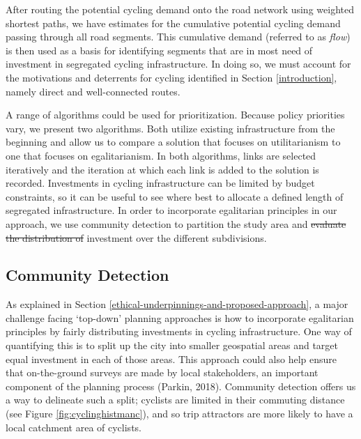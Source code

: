 \documentclass[
]{article}
\providecommand{\DIFaddtex}[1]{{\protect\color{blue}\uwave{#1}}} %
\providecommand{\DIFdeltex}[1]{{\protect\color{red}\sout{#1}}}                      %
\providecommand{\DIFaddbegin}{} %
\providecommand{\DIFaddend}{} %
\providecommand{\DIFdelbegin}{} %
\providecommand{\DIFdelend}{} %
\providecommand{\DIFadd}[1]{\texorpdfstring{\DIFaddtex{#1}}{#1}} %
\providecommand{\DIFdel}[1]{\texorpdfstring{\DIFdeltex{#1}}{}} %
\newcommand{\DIFscaledelfig}{0.5}
\newlength{\DIFdelgraphicswidth} %
\newlength{\DIFdelgraphicsheight} %
\newcommand{\DIFaddincludegraphics}[2][]{{\color{blue}\fbox{\DIFOincludegraphics[#1]{#2}}}} %
\newcommand{\DIFdelincludegraphics}[2][]{%
\sbox{\DIFdelgraphicsbox}{\DIFOincludegraphics[#1]{#2}}%
\settoboxwidth{\DIFdelgraphicswidth}{\DIFdelgraphicsbox} %
\settoboxtotalheight{\DIFdelgraphicsheight}{\DIFdelgraphicsbox} %
\scalebox{\DIFscaledelfig}{%
\parbox[b]{\DIFdelgraphicswidth}{\usebox{\DIFdelgraphicsbox}\\[-\baselineskip] \rule{\DIFdelgraphicswidth}{0em}}\llap{\resizebox{\DIFdelgraphicswidth}{\DIFdelgraphicsheight}{%
\setlength{\unitlength}{\DIFdelgraphicswidth}%
\begin{picture}(1,1)%
\thicklines\linethickness{2pt} %
{\color[rgb]{1,0,0}\put(0,0){\framebox(1,1){}}}%
{\color[rgb]{1,0,0}\put(0,0){\line( 1,1){1}}}%
{\color[rgb]{1,0,0}\put(0,1){\line(1,-1){1}}}%
\end{picture}%
}\hspace*{3pt}}} %
} %
\DeclareRobustCommand{\DIFaddbegin}{\DIFOaddbegin \let\includegraphics\DIFaddincludegraphics} %
\DeclareRobustCommand{\DIFaddend}{\DIFOaddend \let\includegraphics\DIFOincludegraphics} %
\DeclareRobustCommand{\DIFdelbegin}{\DIFOdelbegin \let\includegraphics\DIFdelincludegraphics} %
\DeclareRobustCommand{\DIFdelend}{\DIFOaddend \let\includegraphics\DIFOincludegraphics} %
\begin{document}
After routing the potential cycling demand onto the road network using
weighted shortest paths, we have estimates for the cumulative potential
cycling demand passing through all road segments. This cumulative demand
(referred to as \emph{flow}) is then used as a basis for identifying segments
that are in most need of investment in segregated cycling
infrastructure. In doing so, we must account for the motivations and
deterrents for cycling identified in Section \ref{introduction}, namely
direct and well-connected routes.

A range of algorithms could be used for prioritization. Because policy
priorities vary, we present two algorithms. Both utilize existing
infrastructure from the beginning and allow us to compare a solution
that focuses on utilitarianism to one that focuses on egalitarianism. In
both algorithms, links are selected iteratively and the iteration at
which each link is added to the solution is recorded. Investments in
cycling infrastructure can be limited by budget constraints, so it can
be useful to see where best to allocate a defined length of segregated
infrastructure. In order to incorporate egalitarian principles in our
approach, we use community detection to partition the study area and
\DIFdelbegin \DIFdel{evaluate the distribution of }\DIFdelend \DIFaddbegin \DIFadd{distribute }\DIFaddend investment over the different subdivisions.

\hypertarget{community-detection}{%
\subsection{Community Detection}\label{community-detection}}

As explained in Section
\ref{ethical-underpinnings-and-proposed-approach}, a major challenge
facing `top-down' planning approaches is how to incorporate egalitarian
principles by fairly distributing investments in cycling infrastructure.
One way of quantifying this is to split up the city into smaller
geospatial areas and target equal investment in each of those areas.
This approach could also help ensure that on-the-ground surveys are made
by local stakeholders, an important component of the planning process
(Parkin, 2018). Community detection offers us a way to
delineate such a split; cyclists are limited in their commuting distance
(see Figure \ref{fig:cyclinghistmanc}), and so trip attractors are more
likely to have a local catchment area of cyclists.
\end{document}
